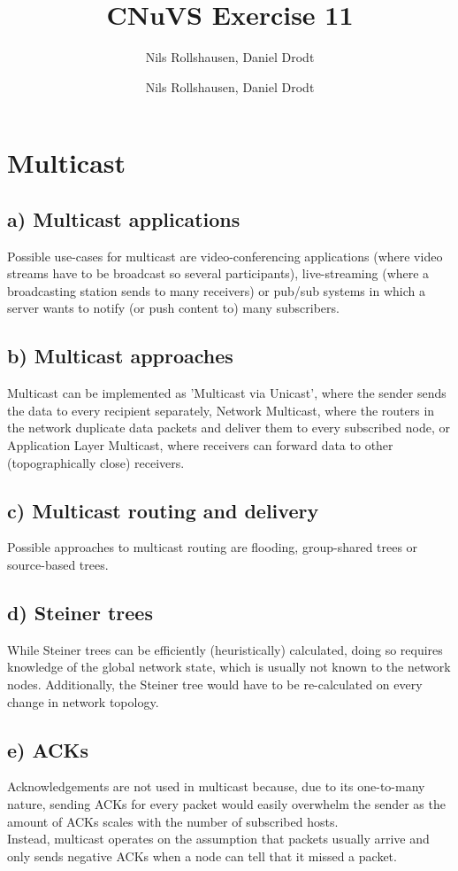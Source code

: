 \documentclass[a4paper, 11 pt, article, accentcolor=tud7b]{tudreport}
\title{CNuVS Exercise 11}
\author{Nils Rollshausen, Daniel Drodt}
\subtitle{Nils Rollshausen, Daniel Drodt}
\begin{document}
	\maketitle
	\section{Multicast}
	\subsection*{a) Multicast applications}
	Possible use-cases for multicast are video-conferencing applications (where video streams have to be broadcast so several participants), live-streaming (where a broadcasting station sends to many receivers) or pub/sub systems in which a server wants to notify (or push content to) many subscribers.
	  
	\subsection*{b) Multicast approaches}
	Multicast can be implemented as 'Multicast via Unicast', where the sender sends the data to every recipient separately, Network Multicast, where the routers in the network duplicate data packets and deliver them to every subscribed node, or Application Layer Multicast, where receivers can forward data to other (topographically close) receivers.
	
	\subsection*{c) Multicast routing and delivery}
	Possible approaches to multicast routing are flooding, group-shared trees or source-based trees.
	
	\subsection*{d) Steiner trees}
	While Steiner trees can be efficiently (heuristically) calculated, doing so requires knowledge of the global network state, which is usually not known to the network nodes. Additionally, the Steiner tree would have to be re-calculated on every change in network topology.
	
	\subsection*{e) ACKs}
	Acknowledgements are not used in multicast because, due to its one-to-many nature, sending ACKs for every packet would easily overwhelm the sender as the amount of ACKs scales with the number of subscribed hosts. \\
	Instead, multicast operates on the assumption that packets usually arrive and only sends negative ACKs when a node can tell that it missed a packet.
	
\end{document}
